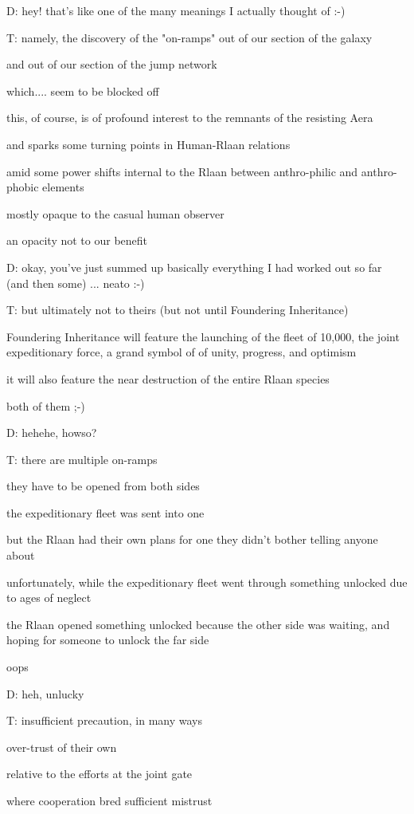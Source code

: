 D: hey! that's like one of the many meanings I actually thought of :-)

T: namely, the discovery of the "on-ramps" out of our section of the galaxy

and out of our section of the jump network

which.... seem to be blocked off

this, of course, is of profound interest to the remnants of the resisting Aera

and sparks some turning points in Human-Rlaan relations

amid some power shifts internal to the Rlaan between anthro-philic and anthro-phobic elements

mostly opaque to the casual human observer

an opacity not to our benefit

D: okay, you've just summed up basically everything I had worked out so far (and then some) ... neato :-)

T: but ultimately not to theirs (but not until Foundering Inheritance)

Foundering Inheritance will feature the launching of the fleet of 10,000, the joint expeditionary force, a grand symbol of of unity, progress, and optimism 

it will also feature the near destruction of the entire Rlaan species

both of them ;-)

D: hehehe, howso?

T: there are multiple on-ramps

they have to be opened from both sides

the expeditionary fleet was sent into one

but the Rlaan had their own plans for one they didn't bother telling anyone about

unfortunately, while the expeditionary fleet went through something unlocked due to ages of neglect

the Rlaan opened something unlocked because the other side was waiting, and hoping for someone to unlock the far side

oops

D: heh, unlucky

T: insufficient precaution, in many ways

over-trust of their own

relative to the efforts at the joint gate

where cooperation bred sufficient mistrust

